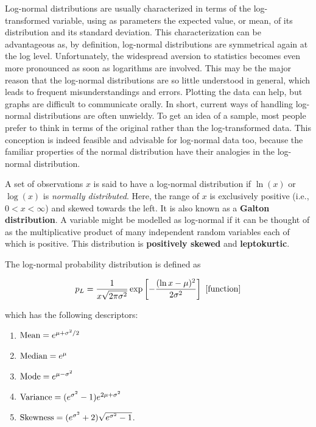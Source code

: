 \documentclass[a4paper,10pt]{article}
\begin{document}
{\noindent}Log-normal distributions are usually characterized in terms of the log-transformed variable, using as parameters the expected value, or mean, of its distribution and its standard deviation. This characterization can be advantageous as, by definition, log-normal distributions are symmetrical again at the log level. Unfortunately, the widespread aversion to statistics becomes even more pronounced as soon as logarithms are involved. This may be the major reason that the log-normal distributions are so little understood in general, which leads to frequent misunderstandings and errors. Plotting the data can help, but graphs are difficult to communicate orally. In short, current ways of handling log-normal distributions are often unwieldy. To get an idea of a sample, most people prefer to think in terms of the original rather than the log-transformed data. This conception is indeed feasible and advisable for log-normal data too, because the familiar properties of the normal distribution have their analogies in the log-normal distribution.

{\noindent}A set of observations $x$ is said to have a log-normal distribution if $\ln(x)$ or $\log(x)$ is \textit{normally distributed}. Here, the range of $x$ is exclusively positive (i.e., $0<x<\infty$) and skewed towards the left. It is also known as a \textbf{Galton distribution}. A variable might be modelled as log-normal if it can be thought of as the multiplicative product of many independent random variables each of which is positive. This distribution is \textbf{positively skewed} and \textbf{leptokurtic}.

{\noindent}The log-normal probability distribution is defined as

\begin{align*}
    p_L = \frac{1}{x\sqrt{2\pi\sigma^2}} \exp \left[-\frac{(\ln x-\mu)^2}{2\sigma^2}\right] ~ [{\rm function}]
\end{align*}

{\noindent}which has the following descriptors:

\begin{enumerate}
    \item ${\rm Mean} = e^{\mu+\sigma^2/2}$
    \item ${\rm Median} = e^\mu$
    \item ${\rm Mode} = e^{\mu-\sigma^2}$
    \item ${\rm Variance} = (e^{\sigma^2}-1)e^{2\mu+\sigma^2}$
    \item ${\rm Skewness} = (e^{\sigma^2}+2)\sqrt{e^{\sigma^2}-1}$.
\end{enumerate}
\end{document}
